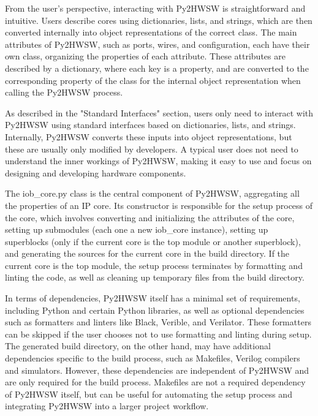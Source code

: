 %


From the user's perspective, interacting with Py2HWSW is straightforward and intuitive. Users describe cores using dictionaries, lists, and strings, which are then converted internally into object representations of the correct class. The main attributes of Py2HWSW, such as ports, wires, and configuration, each have their own class, organizing the properties of each attribute. These attributes are described by a dictionary, where each key is a property, and are converted to the corresponding property of the class for the internal object representation when calling the Py2HWSW process.

As described in the "Standard Interfaces" section, users only need to interact with Py2HWSW using standard interfaces based on dictionaries, lists, and strings. Internally, Py2HWSW converts these inputs into object representations, but these are usually only modified by developers. A typical user does not need to understand the inner workings of Py2HWSW, making it easy to use and focus on designing and developing hardware components.

The iob\_core.py class is the central component of Py2HWSW, aggregating all the properties of an IP core. Its constructor is responsible for the setup process of the core, which involves converting and initializing the attributes of the core, setting up submodules (each one a new iob\_core instance), setting up superblocks (only if the current core is the top module or another superblock), and generating the sources for the current core in the build directory. If the current core is the top module, the setup process terminates by formatting and linting the code, as well as cleaning up temporary files from the build directory.

In terms of dependencies, Py2HWSW itself has a minimal set of requirements, including Python and certain Python libraries, as well as optional dependencies such as formatters and linters like Black, Verible, and Verilator. These formatters can be skipped if the user chooses not to use formatting and linting during setup. The generated build directory, on the other hand, may have additional dependencies specific to the build process, such as Makefiles, Verilog compilers and simulators. However, these dependencies are independent of Py2HWSW and are only required for the build process. Makefiles are not a required dependency of Py2HWSW itself, but can be useful for automating the setup process and integrating Py2HWSW into a larger project workflow. 
